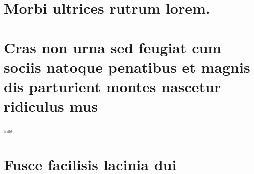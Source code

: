 \begin{anexosenv}
\partanexos
\chapter{Morbi ultrices rutrum lorem.}
\lipsum[30]
\chapter{Cras non urna sed feugiat cum sociis natoque penatibus et magnis dis
parturient montes nascetur ridiculus mus}
sss
\chapter{Fusce facilisis lacinia dui}
\lipsum[32]
\end{anexosenv}